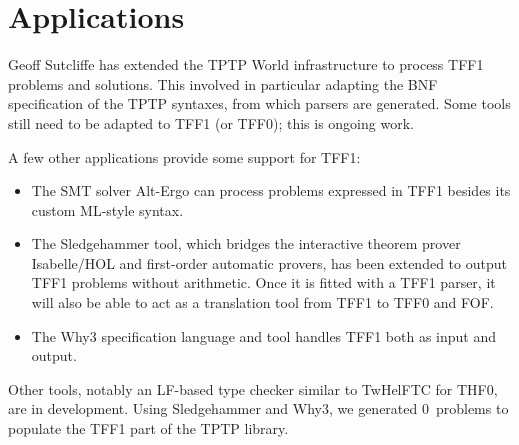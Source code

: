 \section{Applications}
\label{sec_apps}

Geoff Sutcliffe has extended the TPTP World infrastructure to process TFF1
problems and solutions. This involved in particular adapting the BNF
specification of the TPTP syntaxes, from which parsers are generated. Some tools
still need to be adapted to TFF1 (or TFF0); this is ongoing work.

A few other applications provide some support for TFF1:
%
\begin{itemize}
\item The SMT solver Alt-Ergo can process problems expressed in TFF1 besides its
custom ML-style syntax.

\item The Sledgehammer tool, which bridges the interactive theorem prover
Isabelle\slash HOL and first-order automatic provers, has been extended to
output TFF1 problems without arithmetic. Once it is fitted with a TFF1 parser,
it will also be able to act as a translation tool from TFF1 to TFF0 and FOF.

\item The Why3 specification language and tool handles TFF1 both as input and
output.
\end{itemize}

Other tools, notably an LF-based type checker similar to TwHelFTC for THF0,
are in development.
%
Using Sledgehammer and Why3, we generated 0~problems to populate the TFF1
part of the TPTP library.

%
%
%
%

